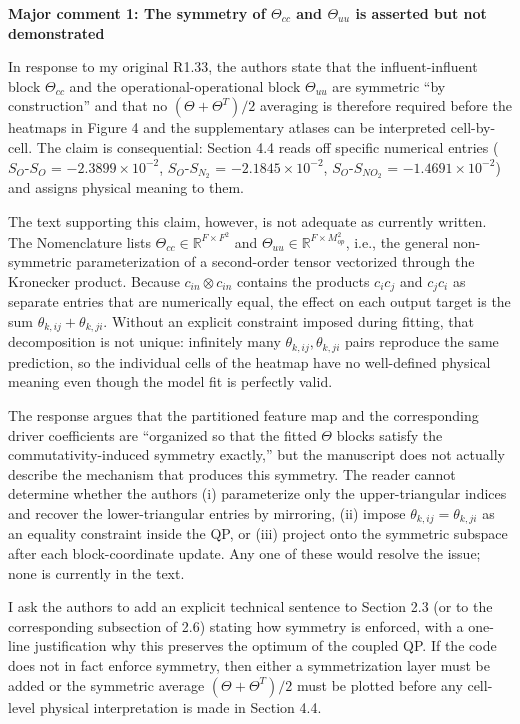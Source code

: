 \documentclass[11pt,a4paper]{article}
\begin{document}
\begin{reviewercomment}
\textbf{Major comment 1: The symmetry of $\Theta_{cc}$ and $\Theta_{uu}$ is asserted but not demonstrated}

In response to my original R1.33, the authors state that the influent-influent block $\Theta_{cc}$ and the operational-operational block $\Theta_{uu}$ are symmetric ``by construction'' and that no $(\Theta+\Theta^{T})/2$ averaging is therefore required before the heatmaps in Figure 4 and the supplementary atlases can be interpreted cell-by-cell. The claim is consequential: Section 4.4 reads off specific numerical entries ($S_O$-$S_O$ = $-2.3899\times10^{-2}$, $S_O$-$S_{N_2}$ = $-2.1845\times10^{-2}$, $S_O$-$S_{NO_2}$ = $-1.4691\times10^{-2}$) and assigns physical meaning to them.

The text supporting this claim, however, is not adequate as currently written. The Nomenclature lists $\Theta_{cc}\in\mathbb{R}^{F\times F^2}$ and $\Theta_{uu}\in\mathbb{R}^{F\times M_{op}^2}$, i.e., the general non-symmetric parameterization of a second-order tensor vectorized through the Kronecker product. Because $c_{in}\otimes c_{in}$ contains the products $c_i c_j$ and $c_j c_i$ as separate entries that are numerically equal, the effect on each output target is the sum $\theta_{k,ij}+\theta_{k,ji}$. Without an explicit constraint imposed during fitting, that decomposition is not unique: infinitely many $\theta_{k,ij},\theta_{k,ji}$ pairs reproduce the same prediction, so the individual cells of the heatmap have no well-defined physical meaning even though the model fit is perfectly valid.

The response argues that the partitioned feature map and the corresponding driver coefficients are ``organized so that the fitted $\Theta$ blocks satisfy the commutativity-induced symmetry exactly,'' but the manuscript does not actually describe the mechanism that produces this symmetry. The reader cannot determine whether the authors (i) parameterize only the upper-triangular indices and recover the lower-triangular entries by mirroring, (ii) impose $\theta_{k,ij}=\theta_{k,ji}$ as an equality constraint inside the QP, or (iii) project onto the symmetric subspace after each block-coordinate update. Any one of these would resolve the issue; none is currently in the text.

I ask the authors to add an explicit technical sentence to Section 2.3 (or to the corresponding subsection of 2.6) stating how symmetry is enforced, with a one-line justification why this preserves the optimum of the coupled QP. If the code does not in fact enforce symmetry, then either a symmetrization layer must be added or the symmetric average $(\Theta+\Theta^{T})/2$ must be plotted before any cell-level physical interpretation is made in Section 4.4.
\end{reviewercomment}
\end{document}
